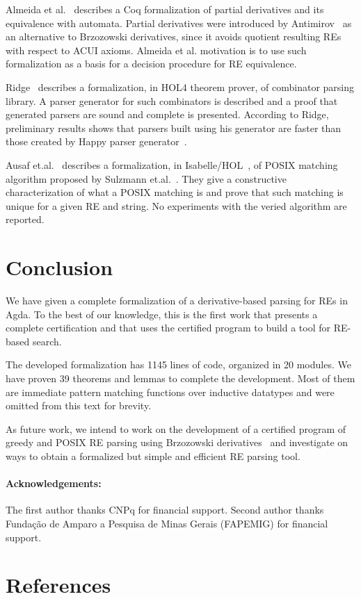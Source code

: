 \documentclass[review]{elsarticle}
\begin{document}
Almeida et al.~\cite{AlmeidaMPS10} describes a Coq formalization of
partial derivatives and its equivalence with automata. Partial
derivatives were introduced by Antimirov~\cite{Antimirov91} as
an alternative to Brzozowski derivatives, since it avoids quotient
resulting REs with respect to ACUI axioms. Almeida et al. motivation
is to use such formalization as a basis for a decision procedure for
RE equivalence.

Ridge~\cite{Ridge2011} describes a formalization, in HOL4 theorem prover, of
combinator parsing library. A parser generator for such combinators is described
and a proof that generated parsers are sound and complete is presented.
According to Ridge, preliminary results shows that parsers built using his
generator are faster than those created by Happy parser generator~\cite{Happy}.

Ausaf et.al.~\cite{AusafDU16} describes a formalization, in Isabelle/HOL~\cite{Nipkow02},
of POSIX matching algorithm proposed by Sulzmann et.al.~\cite{SulzmannL14}. They
give a constructive characterization of what a POSIX matching is and prove that
such matching is unique for a given RE and string. No experiments with the
veried algorithm are reported.


\section{Conclusion}\label{sec:conclusion}

We have given a complete formalization of a derivative-based parsing
for REs in Agda. To the best of our knowledge, this is the first work
that presents a complete certification and that uses the certified
program to build a tool for RE-based search.

The developed formalization has 1145 lines of code, organized in 20
modules. We have proven 39 theorems and lemmas to complete the
development. Most of them are immediate pattern matching functions
over inductive datatypes and were omitted from this text for brevity.

As future work, we intend to work on the development of a certified
program of greedy and POSIX RE parsing using Brzozowski
derivatives~\cite{SulzmannL14,FrischC04} and investigate on
ways to obtain a formalized but simple and efficient RE parsing tool.

\paragraph{Acknowledgements:} The first author thanks CNPq for financial
support. Second author thanks Fundação de Amparo a
Pesquisa de Minas Gerais (FAPEMIG) for financial support.

\section*{References}


\end{document}
